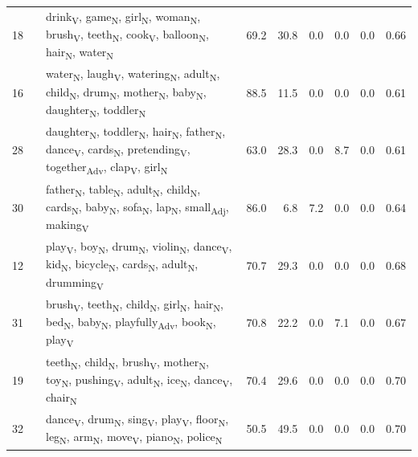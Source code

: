 \begin{landscape}
\begin{xltabular}{\linewidth}{r >{\raggedright\arraybackslash}p{2.9cm} >{\raggedright\arraybackslash}X r r r r r r}
18 &  & drink\textsubscript{V}, game\textsubscript{N}, girl\textsubscript{N}, woman\textsubscript{N}, brush\textsubscript{V}, teeth\textsubscript{N}, cook\textsubscript{V}, balloon\textsubscript{N}, hair\textsubscript{N}, water\textsubscript{N} & 69.2 & 30.8 & 0.0 & 0.0 & 0.0 & 0.66 \\
16 &  & water\textsubscript{N}, laugh\textsubscript{V}, watering\textsubscript{N}, adult\textsubscript{N}, child\textsubscript{N}, drum\textsubscript{N}, mother\textsubscript{N}, baby\textsubscript{N}, daughter\textsubscript{N}, toddler\textsubscript{N} & 88.5 & 11.5 & 0.0 & 0.0 & 0.0 & 0.61 \\
28 &  & daughter\textsubscript{N}, toddler\textsubscript{N}, hair\textsubscript{N}, father\textsubscript{N}, dance\textsubscript{V}, cards\textsubscript{N}, pretending\textsubscript{V}, together\textsubscript{Adv}, clap\textsubscript{V}, girl\textsubscript{N} & 63.0 & 28.3 & 0.0 & 8.7 & 0.0 & 0.61 \\
30 &  & father\textsubscript{N}, table\textsubscript{N}, adult\textsubscript{N}, child\textsubscript{N}, cards\textsubscript{N}, baby\textsubscript{N}, sofa\textsubscript{N}, lap\textsubscript{N}, small\textsubscript{Adj}, making\textsubscript{V} & 86.0 & 6.8 & 7.2 & 0.0 & 0.0 & 0.64 \\
12 &  & play\textsubscript{V}, boy\textsubscript{N}, drum\textsubscript{N}, violin\textsubscript{N}, dance\textsubscript{V}, kid\textsubscript{N}, bicycle\textsubscript{N}, cards\textsubscript{N}, adult\textsubscript{N}, drumming\textsubscript{V} & 70.7 & 29.3 & 0.0 & 0.0 & 0.0 & 0.68 \\
31 &  & brush\textsubscript{V}, teeth\textsubscript{N}, child\textsubscript{N}, girl\textsubscript{N}, hair\textsubscript{N}, bed\textsubscript{N}, baby\textsubscript{N}, playfully\textsubscript{Adv}, book\textsubscript{N}, play\textsubscript{V} & 70.8 & 22.2 & 0.0 & 7.1 & 0.0 & 0.67 \\
19 &  & teeth\textsubscript{N}, child\textsubscript{N}, brush\textsubscript{V}, mother\textsubscript{N}, toy\textsubscript{N}, pushing\textsubscript{V}, adult\textsubscript{N}, ice\textsubscript{N}, dance\textsubscript{V}, chair\textsubscript{N} & 70.4 & 29.6 & 0.0 & 0.0 & 0.0 & 0.70 \\
32 &  & dance\textsubscript{V}, drum\textsubscript{N}, sing\textsubscript{V}, play\textsubscript{V}, floor\textsubscript{N}, leg\textsubscript{N}, arm\textsubscript{N}, move\textsubscript{V}, piano\textsubscript{N}, police\textsubscript{N} & 50.5 & 49.5 & 0.0 & 0.0 & 0.0 & 0.70 \\

\end{xltabular}
\end{landscape}
